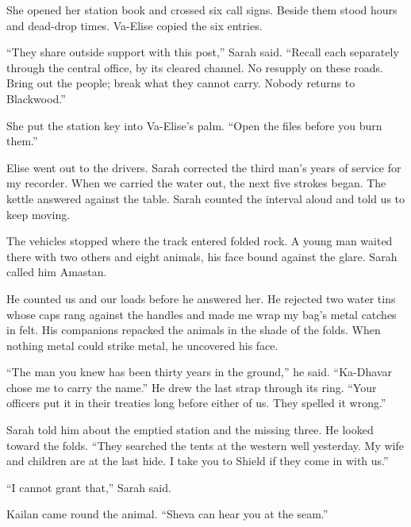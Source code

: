 She opened her station book and crossed six call signs. Beside them stood hours and dead-drop times. Va-Elise copied the six entries.\par

``They share outside support with this post,'' Sarah said. ``Recall each separately through the central office, by its cleared channel. No resupply on these roads. Bring out the people; break what they cannot carry. Nobody returns to Blackwood.''\par

She put the station key into Va-Elise's palm. ``Open the files before you burn them.''\par

Elise went out to the drivers. Sarah corrected the third man's years of service for my recorder. When we carried the water out, the next five strokes began. The kettle answered against the table. Sarah counted the interval aloud and told us to keep moving.\par

\ornament

The vehicles stopped where the track entered folded rock. A young man waited there with two others and eight animals, his face bound against the glare. Sarah called him Amastan.\par

He counted us and our loads before he answered her. He rejected two water tins whose caps rang against the handles and made me wrap my bag's metal catches in felt. His companions repacked the animals in the shade of the folds. When nothing metal could strike metal, he uncovered his face.\par

``The man you knew has been thirty years in the ground,'' he said. ``Ka-Dhavar chose me to carry the name.'' He drew the last strap through its ring. ``Your officers put it in their treaties long before either of us. They spelled it wrong.''\par

Sarah told him about the emptied station and the missing three. He looked toward the folds. ``They searched the tents at the western well yesterday. My wife and children are at the last hide. I take you to Shield if they come in with us.''\par

``I cannot grant that,'' Sarah said.\par

Kailan came round the animal. ``Sheva can hear you at the seam.''\par

